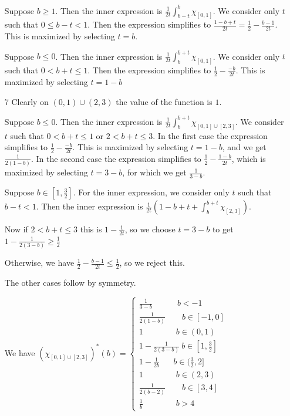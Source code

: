 \documentclass{article}
\begin{document}
\begin{itemize}
    Suppose $b \geq 1$. Then the inner expression is $\frac{1}{2t}\int_{b-t}^b\chi_{[0,1]}$. We consider only $t$ such that $0\leq b-t< 1$. Then the expression simplifies to $\frac{1-b+t}{2t}=\frac{1}{2}-\frac{b-1}{2t}$. This is maximized by selecting $t=b$.

    Suppose $b\leq0$. Then the inner expression is $\frac{1}{2t}\int_b^{b+t}\chi_{[0,1]}$. We consider only $t$ such that $0<b+t\leq 1$. Then the expression simplifies to $\frac{1}{2}-\frac{-b}{2t}$. This is maximized by selecting $t=1-b$

    \item[7] Clearly on $(0,1)\cup (2,3)$ the value of the function is $1$.

    Suppose $b\leq0$. Then the inner expression is $\frac{1}{2t}\int_b^{b+t}\chi_{[0,1]\cup [2,3]}$. We consider $t$ such that $0<b+t\leq1$ or $2<b+t\leq 3$. In the first case the expression simplifies to $\frac{1}{2}-\frac{-b}{2t}$. This is maximized by selecting $t=1-b$, and we get $\frac{1}{2(1-b)}$. In the second case the expression simplifies to $\frac{1}{2}-\frac{1-b}{2t}$, which is maximized by selecting $t=3-b$, for which we get $\frac{1}{3-b}$.

    Suppose $b \in [1,\frac{3}{2}]$. For the inner expression, we consider only $t$ such that $b-t <1$. Then the inner expression is $\frac{1}{2t}(1-b+t+\int_b^{b+t}\chi_{[2,3]})$. 
    
    Now if $2<b+t\leq 3$ this is $1-\frac{1}{2t}$, so we choose $t=3-b$ to get $1-\frac{1}{2(3-b)}\geq\frac{1}{2}$ 

    Otherwise, we have $\frac{1}{2}-\frac{b-1}{2t}\leq \frac{1}{2}$, so we reject this.

    The other cases follow by symmetry.

    We have $(\chi_{[0,1]\cup[2,3]})^*(b)=\begin{cases}
        \frac{1}{3-b} \quad \quad \quad  b<-1 \\
        \frac{1}{2(1-b)} \quad \quad b\in[-1,0] \\
        1  \quad \quad \quad \quad b \in(0,1) \\
        1-\frac{1}{2(3-b)} \ b \in[1,\frac{3}{2}]\\
        1-\frac{1}{2b} \quad \ \ \ b \in (\frac{3}{2},2] \\
        1 \quad \quad \quad \quad b\in (2,3) \\
        \frac{1}{2(b-2)}\quad \quad b \in [3,4] \\
        \frac{1}{b} \quad \quad \quad \quad   b>4
    \end{cases}$


\end{itemize}
\end{document}
